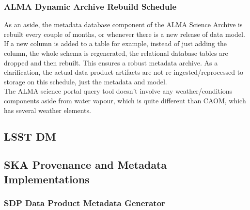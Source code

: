 \subsubsection{ALMA Dynamic Archive Rebuild Schedule}
As an aside, the metadata database component of the ALMA Science Archive is rebuilt every couple of months, or whenever there is a new release of data model.  If a new column is added to a table for example, instead of just adding the column, the whole schema is regenerated, the relational database tables are dropped and then rebuilt.  This ensures a robust metadata archive.  As a clarification, the actual data product artifacts are not re-ingested/reprocessed to storage on this schedule, just the metadata and model.
\\
The ALMA science portal query tool doesn't involve any weather/conditions components aside from water vapour, which is quite different than CAOM, which has several weather elements.  



\subsection{LSST DM}


\subsection{SKA Provenance and Metadata Implementations}

\subsubsection{SDP Data Product Metadata Generator}

